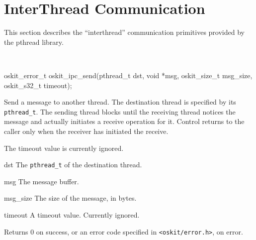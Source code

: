 \section{InterThread Communication}
\label{pthread-ipc}

This section describes the ``interthread'' communication primitives
provided by the pthread library. 

\begin{apisyn}
	\\

	\funcproto oskit_error_t
	oskit_ipc_send(pthread_t dst,
		       void *msg, oskit_size_t msg_size, oskit_s32_t timeout);
\end{apisyn}
\begin{apidesc}
	Send a message to another thread. The destination thread is specified
	by its {\tt pthread_t}. The sending thread blocks until the receiving
	thread notices the message and actually initiates a receive
	operation for it. Control returns to the caller only when the
	receiver has initiated the receive.

	The timeout value is currently ignored.
\end{apidesc}
\begin{apiparm}
	\item[dst]
		The {\tt pthread_t} of the destination thread.
	\item[msg]
		The message buffer.
	\item[msg_size]
		The size of the message, in bytes.
	\item[timeout]
		A timeout value. Currently ignored.
\end{apiparm}
\begin{apiret}
	Returns 0 on success, or an error code specified in
	{\tt <oskit/error.h>}, on error.
\end{apiret}


